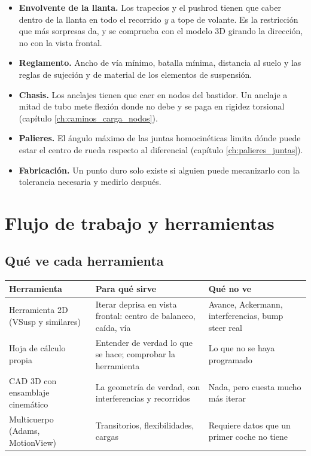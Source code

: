 \begin{itemize}
  \item \textbf{Envolvente de la llanta.} Los trapecios y el pushrod tienen que
        caber dentro de la llanta en todo el recorrido \emph{y} a tope de
        volante. Es la restricción que más sorpresas da, y se comprueba con el
        modelo 3D girando la dirección, no con la vista frontal.
  \item \textbf{Reglamento.} Ancho de vía mínimo, batalla mínima, distancia al
        suelo y las reglas de sujeción y de material de los elementos de
        suspensión.
  \item \textbf{Chasis.} Los anclajes tienen que caer en nodos del bastidor. Un
        anclaje a mitad de tubo mete flexión donde no debe y se paga en rigidez
        torsional (capítulo \ref{ch:caminos_carga_nodos}).
  \item \textbf{Palieres.} El ángulo máximo de las juntas homocinéticas limita
        dónde puede estar el centro de rueda respecto al diferencial
        (capítulo \ref{ch:palieres_juntas}).
  \item \textbf{Fabricación.} Un punto duro solo existe si alguien puede
        mecanizarlo con la tolerancia necesaria y medirlo después.
\end{itemize}

\section{Flujo de trabajo y herramientas}
\label{sec:puntos_duros:02}

\subsection{Qué ve cada herramienta}

\begin{center}
\begin{tabularx}{\textwidth}{@{}lXX@{}}
\toprule
\textbf{Herramienta} & \textbf{Para qué sirve} & \textbf{Qué no ve} \\
\midrule
Herramienta 2D (VSusp y similares) & Iterar deprisa en vista frontal: centro de
  balanceo, caída, vía & Avance, Ackermann, interferencias, bump steer real \\
Hoja de cálculo propia & Entender de verdad lo que se hace; comprobar la
  herramienta & Lo que no se haya programado \\
CAD 3D con ensamblaje cinemático & La geometría de verdad, con interferencias y
  recorridos & Nada, pero cuesta mucho más iterar \\
Multicuerpo (Adams, MotionView) & Transitorios, flexibilidades, cargas &
  Requiere datos que un primer coche no tiene \\
\bottomrule
\end{tabularx}
\end{center}

